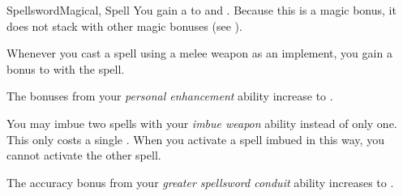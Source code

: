 \begin{feat}{Spellsword}{Magical, Spell}
         You gain a   to  and .
        Because this is a magic bonus, it does not stack with other magic bonuses (see ).

         Whenever you cast a spell using a melee weapon as an implement, you gain a  bonus to  with the spell.

         The bonuses from your \textit{personal enhancement} ability increase to .

         You may imbue two spells with your \textit{imbue weapon} ability instead of only one.
        This only costs a single .
        When you activate a spell imbued in this way, you  cannot activate the other spell.

         The accuracy bonus from your \textit{greater spellsword conduit} ability increases to .
    \end{feat}

